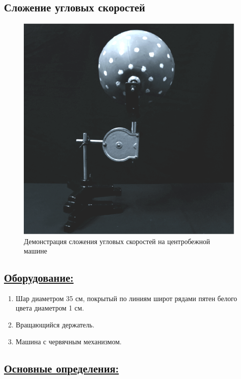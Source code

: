 \documentclass[14pt,a4paper,twoside]{extarticle}	%
\begin{document}

\newpage
\begin{center}
	\subsection*{Сложение угловых скоростей}
\end{center}

\begin{figure}[H] 
	\centering 	
	\includegraphics[width=0.6\linewidth]{angular-1.png}
	\caption{Демонстрация сложения угловых скоростей на центробежной машине}
	\label{angular-1}
\end{figure}

\subsection*{\underline{Оборудование:}}

\begin{enumerate}
	\item Шар диаметром 35 см, покрытый по линиям широт рядами пятен белого цвета диаметром 1 см.
	\item Вращающийся держатель.
	\item Машина с червячным механизмом.
\end{enumerate}

\subsection*{\underline{Основные определения:}}
\end{document}

